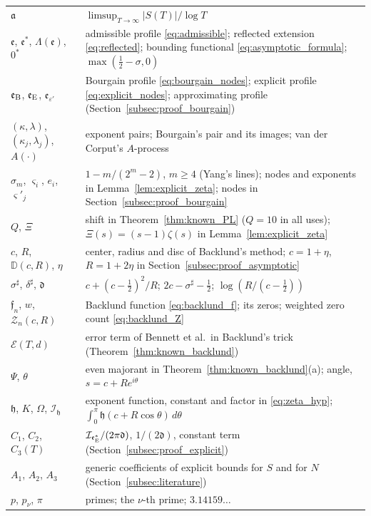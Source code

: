 \documentclass[11pt,a4paper]{article}
\makeatletter
\numberwithin{equation}{section}
\DeclareRobustCommand{\CGref}[1]{\ref{#1}}
\DeclareRobustCommand{\CGeqref}[1]{\eqref{#1}}
\let\CG@origref\ref
\let\CG@origeqref\eqref
\newcommand{\CG@gettip}[1]{\@ifundefined{CGTip@#1}{#1}{\csname CGTip@#1\endcsname}}
\DeclareRobustCommand{\CGref}[1]{\pdftooltip{\CG@origref{#1}}{\CG@gettip{#1}}}
\DeclareRobustCommand{\CGeqref}[1]{\pdftooltip{\CG@origeqref{#1}}{\CG@gettip{#1}}}
\theoremstyle{definition}
\theoremstyle{remark}
\newcommand{\eB}{\mathfrak e_{\rm B}}
\newcommand{\eE}{\mathfrak e_{\rm E}}
\makeatother
\begin{document}
\begin{center}
\begin{longtable}{p{}p{}}
$\mathfrak a$ & $\limsup_{T\to\infty}|S(T)|/\log T$\\
$\mathfrak e$, $\mathfrak e^*$, $\Lambda(\mathfrak e)$, $0^*$ & admissible profile \CGeqref{eq:admissible}; reflected extension \CGeqref{eq:reflected}; bounding functional \CGeqref{eq:asymptotic_formula}; $\max(\frac12-\sigma,0)$\\
$\eB$, $\eE$, $\mathfrak e_{\varepsilon'}$ & Bourgain profile \CGeqref{eq:bourgain_nodes}; explicit profile \CGeqref{eq:explicit_nodes}; approximating profile (Section~\CGref{subsec:proof_bourgain})\\
$(\kappa,\lambda)$, $(\kappa_j,\lambda_j)$, $A(\cdot)$ & exponent pairs; Bourgain's pair and its images; van der Corput's $A$-process\\
$\sigma_m$, $\varsigma_i$, $e_i$, $\varsigma'_j$ & $1-m/(2^m-2)$, $m\ge4$ (Yang's lines); nodes and exponents in Lemma~\CGref{lem:explicit_zeta}; nodes in Section~\CGref{subsec:proof_bourgain}\\
$Q$, $\Xi$ & shift in Theorem~\CGref{thm:known_PL} ($Q=10$ in all uses); $\Xi(s)=(s-1)\zeta(s)$ in Lemma~\CGref{lem:explicit_zeta}\\
$c$, $R$, $\mathbb D(c,R)$, $\eta$ & center, radius and disc of Backlund's method; $c=1+\eta$, $R=1+2\eta$ in Section~\CGref{subsec:proof_asymptotic}\\
$\sigma^\sharp$, $\delta^\sharp$, $\mathfrak d$ & $c+(c-\frac12)^2/R$; $2c-\sigma^\sharp-\frac12$; $\log(R/(c-\frac12))$\\
$\mathfrak f_n$, $w$, $\mathcal Z_n(c,R)$ & Backlund function \CGeqref{eq:backlund_f}; its zeros; weighted zero count \CGeqref{eq:backlund_Z}\\
$\mathcal E(T,d)$ & error term of Bennett et al.\ in Backlund's trick (Theorem~\CGref{thm:known_backlund})\\
$\Psi$, $\theta$ & even majorant in Theorem~\CGref{thm:known_backlund}(a); angle, $s=c+Re^{i\theta}$\\
$\mathfrak h$, $K$, $\Omega$, $\mathcal I_{\mathfrak h}$ & exponent function, constant and factor in \CGeqref{eq:zeta_hyp}; $\int_0^\pi\mathfrak h(c+R\cos\theta)\,d\theta$\\
$C_1$, $C_2$, $C_3(T)$ & $\mathcal I_{\eE^*}/(2\pi\mathfrak d)$, $1/(2\mathfrak d)$, constant term (Section~\CGref{subsec:proof_explicit})\\
$A_1$, $A_2$, $A_3$ & generic coefficients of explicit bounds for $S$ and for $N$ (Section~\CGref{subsec:literature})\\
$p$, $p_\nu$, $\pi$ & primes; the $\nu$-th prime; $3.14159\ldots$\\

\end{longtable}
\end{center}
\end{document}
